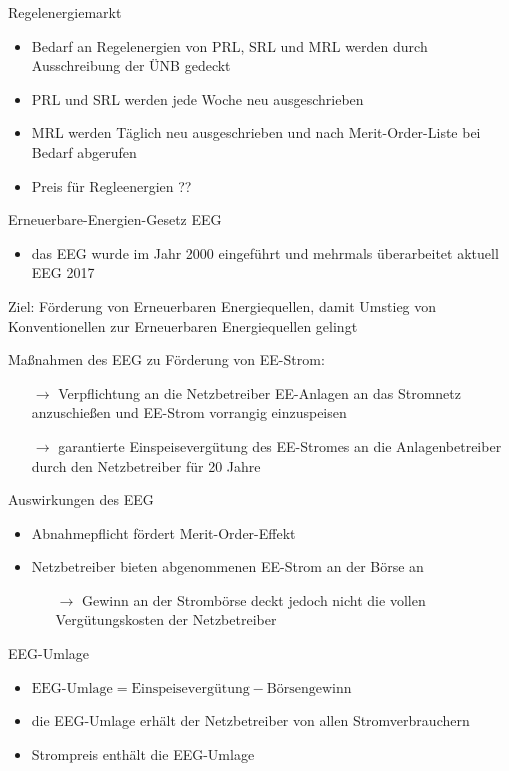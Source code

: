 \documentclass[aspectratio=1610, professionalfonts, 9pt]{beamer}
\begin{document}
\begin{frame}{Regelenergiemarkt}
\begin{itemize}
  \item Bedarf an Regelenergien von PRL, SRL und MRL werden durch Ausschreibung
der ÜNB gedeckt
\item PRL und SRL werden jede Woche neu ausgeschrieben
\item MRL werden Täglich neu ausgeschrieben und nach Merit-Order-Liste bei Bedarf abgerufen
\item Preis für Regleenergien ??
\end{itemize}

\end{frame}
\begin{frame}{Erneuerbare-Energien-Gesetz EEG}
   \begin{itemize}
     \item das EEG wurde im Jahr 2000 eingeführt und mehrmals überarbeitet aktuell EEG 2017
   \end{itemize}
\pause
    \begin{block}{Ziel:}
      Förderung von Erneuerbaren Energiequellen, damit Umstieg von Konventionellen zur Erneuerbaren Energiequellen gelingt
    \end{block}
\pause
    \begin{block}{Maßnahmen des EEG zu Förderung von EE-Strom:}
     \begin{itemize}
       \item[$\rightarrow$] Verpflichtung an die Netzbetreiber EE-Anlagen an das Stromnetz anzuschießen und EE-Strom vorrangig einzuspeisen
       \item[$\rightarrow$] garantierte Einspeisevergütung des EE-Stromes an die Anlagenbetreiber durch den Netzbetreiber für 20 Jahre
   \end{itemize}
   \end{block}
\end{frame}

\begin{frame}{Auswirkungen des EEG}
  \begin{itemize}
    \item Abnahmepflicht fördert Merit-Order-Effekt
    \item Netzbetreiber bieten abgenommenen EE-Strom an der Börse an
\begin{itemize}
  \item[$\rightarrow$] Gewinn an der Strombörse deckt jedoch nicht die vollen Vergütungskosten der Netzbetreiber
\end{itemize}
\end{itemize}
\begin{block}{EEG-Umlage}
\begin{itemize}
  \item $\text{EEG-Umlage}=\text{Einspeisevergütung}-\text{Börsengewinn}$
\item die EEG-Umlage erhält der Netzbetreiber von allen Stromverbrauchern
\item Strompreis enthält die EEG-Umlage
\end{itemize}
\end{block}
\end{frame}
\end{document}
